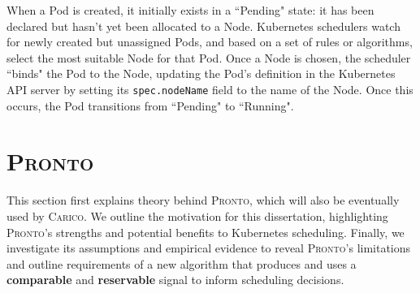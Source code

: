 When a Pod is created, it initially exists in a ``Pending" state: it has been
declared but hasn't yet been allocated to a Node. Kubernetes schedulers watch for
newly created but unassigned Pods, and based on a set of
rules or algorithms, select the most suitable Node for that Pod. Once a Node is
chosen, the scheduler ``binds" the Pod to the Node, updating the Pod's definition
in the Kubernetes API server by setting its \verb|spec.nodeName| field to the
name of the Node. Once this occurs, the Pod transitions from ``Pending" to
``Running".

\section{\protect\textsc{Pronto}}
This section first explains theory behind \textsc{Pronto}, which will also be
eventually used by \textsc{Carico}. We outline the motivation for this
dissertation, highlighting \textsc{Pronto}'s strengths and potential
benefits to Kubernetes scheduling. Finally, we investigate its assumptions and
empirical evidence to reveal \textsc{Pronto}'s limitations and outline
requirements of a new algorithm that produces and uses a \textbf{comparable} and
\textbf{reservable} signal to inform scheduling decisions.

